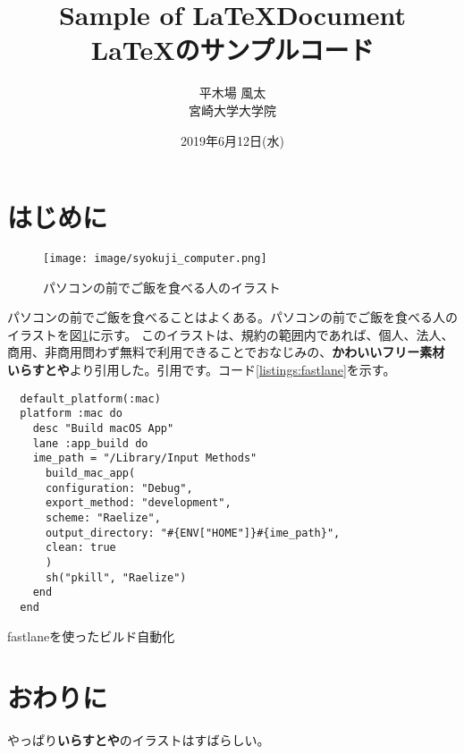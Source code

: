 \documentclass[uplatex,a4j,12pt,twocolumn]{jsarticle}
\begin{document}
\title{\bf{\LARGE{Sample of \LaTeX  Document} \\ \Large{\LaTeX のサンプルコード}}}
\author{平木場 風太\\宮崎大学大学院}
\date{2019年6月12日(水)}
\maketitle


\section{はじめに}
\begin{figure}[t]
    \begin{center}
        \texttt{[image: image/syokuji\_computer.png]}
        \caption{パソコンの前でご飯を食べる人のイラスト}
        \label{fig:syokuji_computer}
    \end{center}
\end{figure}

パソコンの前でご飯を食べることはよくある。パソコンの前でご飯を食べる人のイラストを図\ref{fig:syokuji_computer}に示す。
このイラストは、規約の範囲内であれば、個人、法人、商用、非商用問わず無料で利用できることでおなじみの、{\bf かわいいフリー素材 いらすとや}より引用した。\cite{bib:console}引用です。コード\ref{listings:fastlane}を示す。

\begin{listing}[h]
    \begin{verbatim}
  default_platform(:mac)
  platform :mac do
    desc "Build macOS App"
    lane :app_build do
    ime_path = "/Library/Input Methods"
      build_mac_app(
      configuration: "Debug",
      export_method: "development",
      scheme: "Raelize",
      output_directory: "#{ENV["HOME"]}#{ime_path}",
      clean: true
      )
      sh("pkill", "Raelize")
    end
  end
    \end{verbatim}
    \caption{fastlaneを使ったビルド自動化}\label{listings:fastlane}
  \end{listing}

\section{おわりに}
やっぱり{\bf いらすとや}のイラストはすばらしい。

 
 
\end{document}
